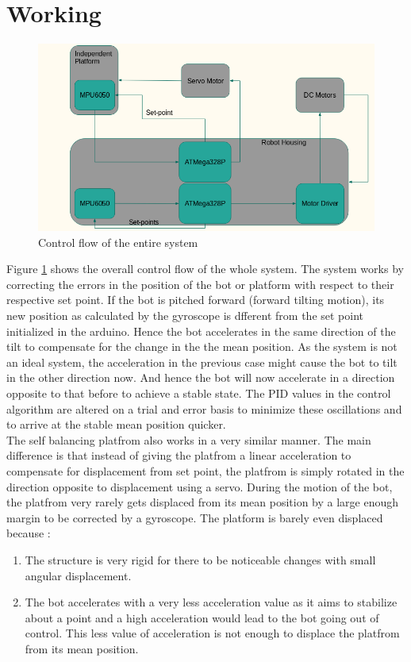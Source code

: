 \section{Working}

\begin{figure}[H]
\centering
\includegraphics[width=\textwidth,height=\textheight,keepaspectratio]{images/control}
\caption{Control flow of the entire system}
\label{fig:control}
\end{figure}

Figure \ref{fig:control} shows the overall control flow of the whole system. The system works by correcting the errors in the position of the bot or platform with respect to their respective set point. \newline
If the bot is pitched forward (forward tilting motion), its new position as calculated by the gyroscope is dfferent from the set point initialized in the arduino. Hence the bot accelerates in the same direction of the tilt to compensate for the change in the the mean position. As the system is not an ideal system, the acceleration in the previous case might cause the bot to tilt in the other direction now. And hence the bot will now accelerate in a direction opposite to that before to achieve a stable state. \newline
The PID values in the control algorithm are altered on a trial and error basis to minimize these oscillations and to arrive at the stable mean position quicker.\\

The self balancing platfrom also works in a very similar manner. The main difference is that instead of giving the platfrom a linear acceleration to compensate for displacement from set point, the platfrom is simply rotated in the direction opposite to displacement using a servo. \newline
During the motion of the bot, the platfrom very rarely gets displaced from its mean position by a large enough margin to be corrected by a gyroscope. The platform is barely even displaced because :
\begin{enumerate}
  \item The structure is very rigid for there to be noticeable changes with small angular displacement.
  \item The bot accelerates with a very less acceleration value as it aims to stabilize about a point and a high acceleration would lead to the bot going out of control. This less value of acceleration is not enough to displace the platfrom from its mean position.
\end{enumerate}
